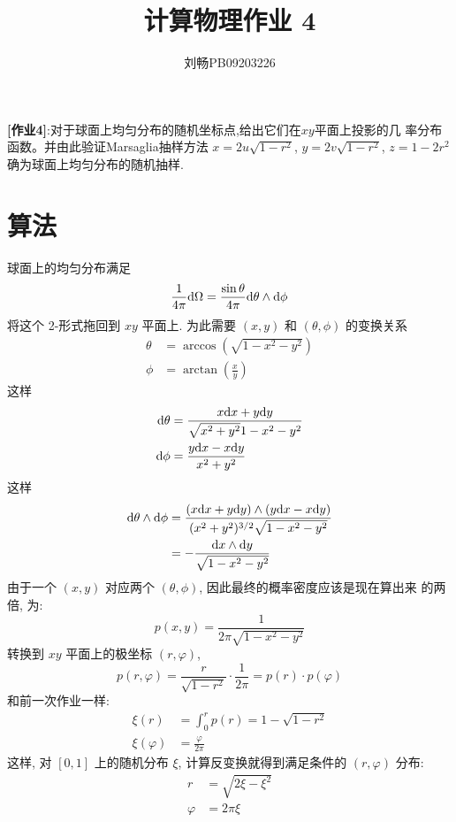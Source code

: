 \documentclass{ctexart}
\def\dd{{\rm d}}
\begin{document}
\title{计算物理作业 4}
\author{刘畅\quad PB09203226}
\maketitle

{\bf [作业4]}:对于球面上均匀分布的随机坐标点,给出它们在$xy$平面上投影的几
率分布函数。并由此验证Marsaglia抽样方法 $x=2u\sqrt{1-r^2}$, $y=2v\sqrt{1-r^2}$,
$z=1-2r^2$ 确为球面上均匀分布的随机抽样.

\section{算法}
球面上的均匀分布满足
\[
\frac{1}{4\pi}\dd\Omega = \frac{\sin\theta}{4\pi}\dd\theta\wedge\dd\phi
\]
将这个 2-形式拖回到 $xy$ 平面上. 为此需要 $(x,y)$ 和 $(\theta,\phi)$ 的变换关系
\begin{align*}
\theta &= \arccos (\sqrt{1-x^2-y^2})\\
\phi &= \arctan\left(\frac{x}{y}\right)
\end{align*}
这样
\begin{align*}
\dd\theta &= \frac{x\dd x + y\dd y}{\sqrt{x^2+y^2}{1-x^2-y^2}}\\
\dd\phi & = \frac{y\dd x - x \dd y}{x^2+y^2}
\end{align*}
这样
\begin{align*}
\dd\theta\wedge\dd\phi &=  \frac{(x\dd x+y\dd y)\wedge(y\dd x- x\dd y)}
{(x^2+y^2)^{3/2}\sqrt{1-x^2-y^2}}\\
&=-\frac{\dd x\wedge\dd y}{\sqrt{1-x^2-y^2}}
\end{align*}
由于一个 $(x,y)$ 对应两个 $(\theta,\phi)$, 因此最终的概率密度应该是现在算出来
的两倍, 为:
\[
p(x,y) = \frac{1}{2\pi\sqrt{1-x^2-y^2}}
\]
转换到 $xy$ 平面上的极坐标 $(r,\varphi)$,
\[
p(r,\varphi) = \frac{r}{\sqrt{1-r^2}} \cdot \frac{1}{2\pi} = p(r)\cdot
p(\varphi)
\]
和前一次作业一样:
\begin{align*}
\xi(r) &= \int_0^r p(r) = 1 - \sqrt{1-r^2}\\
\xi(\varphi) &= \frac{\varphi}{2\pi}
\end{align*}
这样, 对 $[0,1]$ 上的随机分布 $\xi$, 计算反变换就得到满足条件的 $(r,\varphi)$
分布:
\begin{align*}
r &= \sqrt{2\xi - \xi^2}\\
\varphi &= 2\pi\xi
\end{align*}
\end{document}
